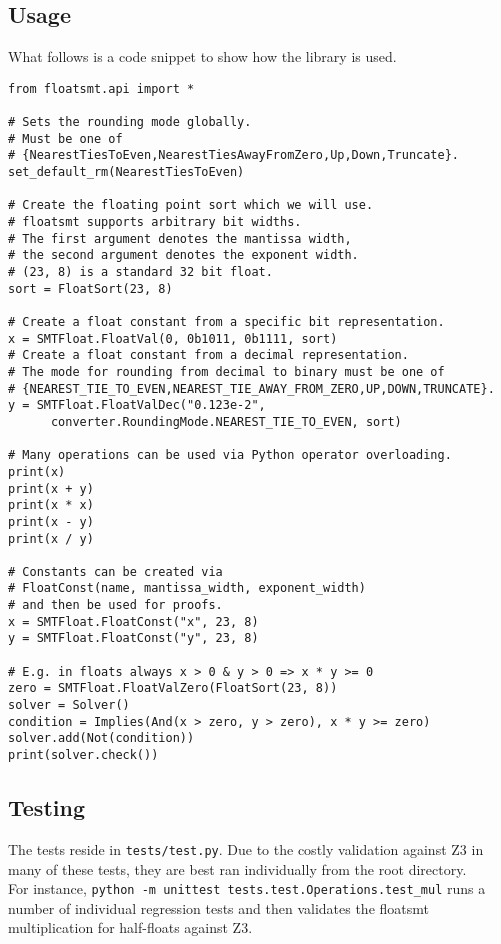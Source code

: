 \documentclass[a4paper,UKenglish,cleveref, autoref, thm-restate]{lipics-v2019}
\begin{document}
\subsection{Usage}
What follows is a code snippet to show how the library is used.
\begin{lstlisting}
from floatsmt.api import *

# Sets the rounding mode globally.
# Must be one of 
# {NearestTiesToEven,NearestTiesAwayFromZero,Up,Down,Truncate}.
set_default_rm(NearestTiesToEven)

# Create the floating point sort which we will use.
# floatsmt supports arbitrary bit widths.
# The first argument denotes the mantissa width,
# the second argument denotes the exponent width.
# (23, 8) is a standard 32 bit float.
sort = FloatSort(23, 8)

# Create a float constant from a specific bit representation.
x = SMTFloat.FloatVal(0, 0b1011, 0b1111, sort)
# Create a float constant from a decimal representation. 
# The mode for rounding from decimal to binary must be one of
# {NEAREST_TIE_TO_EVEN,NEAREST_TIE_AWAY_FROM_ZERO,UP,DOWN,TRUNCATE}.
y = SMTFloat.FloatValDec("0.123e-2", 
      converter.RoundingMode.NEAREST_TIE_TO_EVEN, sort)

# Many operations can be used via Python operator overloading.
print(x)
print(x + y)
print(x * x)
print(x - y) 
print(x / y)

# Constants can be created via 
# FloatConst(name, mantissa_width, exponent_width)
# and then be used for proofs.
x = SMTFloat.FloatConst("x", 23, 8)
y = SMTFloat.FloatConst("y", 23, 8)

# E.g. in floats always x > 0 & y > 0 => x * y >= 0
zero = SMTFloat.FloatValZero(FloatSort(23, 8))
solver = Solver()
condition = Implies(And(x > zero, y > zero), x * y >= zero)
solver.add(Not(condition))
print(solver.check())
\end{lstlisting}

\subsection{Testing}
The tests reside in \verb|tests/test.py|. Due to the costly validation against Z3 in many of these tests, they are best ran individually from the root directory. \\
For instance, \verb|python -m unittest tests.test.Operations.test_mul| runs a number of individual regression tests and then validates the floatsmt multiplication for half-floats against Z3.
\end{document}
